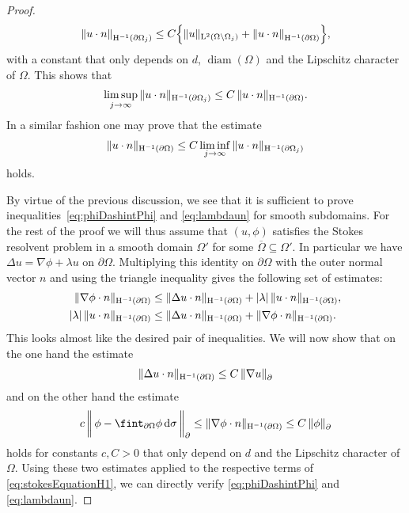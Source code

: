 \begin{proof}
  \begin{align*}
    \| u \cdot n \|_{\mathrm{H}^{-1}(\partial\Omega_j)}^{} \leq C \Big\{ \|u\|_{\mathrm{L}^2(\Omega\setminus \Omega_j)} + \|u \cdot n \|_{\mathrm{H}^{-1}(\partial\Omega)}^{} \Big\},
  \end{align*}
  with a constant that only depends on $d$, $\operatorname{diam}(\Omega)$ and the Lipschitz character of $\Omega$.
  This shows that
  \begin{align*}
    \limsup_{j \to \infty} \|u \cdot n\|_{\mathrm{H}^{-1}(\partial\Omega_j)} \leq C \, \|u \cdot n\|_{\mathrm{H}^{-1}(\partial\Omega)}.
  \end{align*}
  In a similar fashion one may prove that the estimate
  \begin{align*}
    \|u \cdot n\|_{\mathrm{H}^{-1}(\partial\Omega)} \leq C \liminf_{j \to \infty} \|u \cdot n\|_{\mathrm{H}^{-1}(\partial\Omega_j)} 
  \end{align*}
  holds.

  By virtue of the previous discussion, we see that it is sufficient to prove inequalities~\eqref{eq:phiDashintPhi} and  \eqref{eq:lambdaun} for smooth subdomains.  
  For the rest of the proof we will thus assume that $(u,\phi)$ satisfies the Stokes resolvent problem in a smooth domain $\Omega'$ for some $\overline \Omega \subseteq \Omega'$.
  In particular we have $\Delta u = \nabla \phi + \lambda u$  on $\partial\Omega$.
  Multiplying this identity  on $\partial\Omega$ with the outer normal vector $n$ and using the triangle inequality gives the following set of estimates:
  \begin{align}
    \label{eq:stokesEquationH1}
    \begin{alignedat}{1}
    \|\nabla \phi \cdot n\|_{\mathrm{H}^{-1}(\partial\Omega)} 
    &\leq \|\Delta u \cdot n \|_{\mathrm{H}^{-1}(\partial\Omega)} + |\lambda|\, \| u\cdot n\|_{\mathrm{H}^{-1}(\partial\Omega)}, \\
    |\lambda|\, \| u\cdot n \|_{\mathrm{H}^{-1}(\partial\Omega)} 
    &\leq \|\Delta u \cdot n \|_{\mathrm{H}^{-1}(\partial\Omega)} + \|\nabla \phi \cdot n \|_{\mathrm{H}^{-1}(\partial\Omega)}.
    \end{alignedat}
  \end{align}
  This looks almost like the desired pair of inequalities.
  We will now show that on the one hand the estimate
  \begin{align}
    \label{eq:deltaun}
    \|\Delta u \cdot n\|_{\mathrm{H}^{-1}(\partial\Omega)}
    \leq C\, \|\nabla u\|^{}_\partial
  \end{align}
  and on the other hand the estimate
  \begin{align}
    \label{eq:nablaPhin}
    c \, \bigg\|\,\phi - \fint_{\partial\Omega} \phi \d\sigma  \, \bigg\|^{}_\partial 
    \leq \|\nabla \phi \cdot n\|_{\HH^{-1}(\partial\Omega)}
    \leq C\,  \|\phi\|^{}_\partial
  \end{align}
  holds for constants $c, C > 0$ that only depend on $d$ and the Lipschitz character of $\Omega$.
  Using these two estimates applied to the respective terms of \eqref{eq:stokesEquationH1}, we can directly verify \eqref{eq:phiDashintPhi} and \eqref{eq:lambdaun}.


\end{proof}
